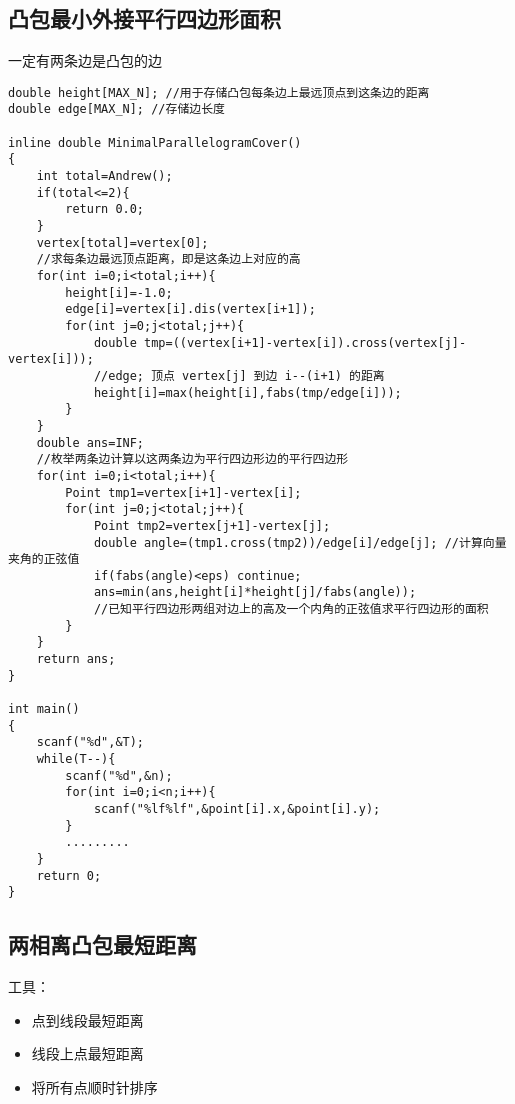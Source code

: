 \subsection{凸包最小外接平行四边形面积}
一定有两条边是凸包的边
\begin{lstlisting}
double height[MAX_N]; //用于存储凸包每条边上最远顶点到这条边的距离
double edge[MAX_N]; //存储边长度

inline double MinimalParallelogramCover()
{
    int total=Andrew();
    if(total<=2){
        return 0.0;
    }
    vertex[total]=vertex[0];
    //求每条边最远顶点距离，即是这条边上对应的高
    for(int i=0;i<total;i++){
        height[i]=-1.0;
        edge[i]=vertex[i].dis(vertex[i+1]);
        for(int j=0;j<total;j++){
            double tmp=((vertex[i+1]-vertex[i]).cross(vertex[j]-vertex[i]));
            //edge; 顶点 vertex[j] 到边 i--(i+1) 的距离
            height[i]=max(height[i],fabs(tmp/edge[i]));
        }
    }
    double ans=INF;
    //枚举两条边计算以这两条边为平行四边形边的平行四边形
    for(int i=0;i<total;i++){
        Point tmp1=vertex[i+1]-vertex[i];
        for(int j=0;j<total;j++){
            Point tmp2=vertex[j+1]-vertex[j];
            double angle=(tmp1.cross(tmp2))/edge[i]/edge[j]; //计算向量夹角的正弦值
            if(fabs(angle)<eps) continue;
            ans=min(ans,height[i]*height[j]/fabs(angle));
            //已知平行四边形两组对边上的高及一个内角的正弦值求平行四边形的面积
        }
    }
    return ans;
}

int main()
{
    scanf("%d",&T);
    while(T--){
        scanf("%d",&n);
        for(int i=0;i<n;i++){
            scanf("%lf%lf",&point[i].x,&point[i].y);
        }
        .........
    }
    return 0;
}
\end{lstlisting}

\subsection{两相离凸包最短距离}
工具：
\begin{itemize}
  \item 点到线段最短距离
  \item 线段上点最短距离
  \item 将所有点顺时针排序
\end{itemize}

